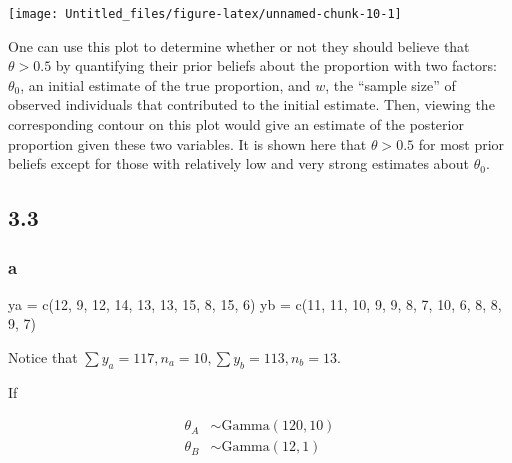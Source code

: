 \documentclass[
]{article}
\newenvironment{Shaded}{\begin{snugshade}}{\end{snugshade}}
\newcommand{\DecValTok}[1]{\textcolor[rgb]{0.00,0.00,0.81}{#1}}
\newcommand{\FunctionTok}[1]{\textcolor[rgb]{0.00,0.00,0.00}{#1}}
\newcommand{\NormalTok}[1]{#1}
\newcommand{\OtherTok}[1]{\textcolor[rgb]{0.56,0.35,0.01}{#1}}
\begin{document}
\begin{center}\texttt{[image: Untitled\_files/figure-latex/unnamed-chunk-10-1]} \end{center}

One can use this plot to determine whether or not they should believe
that \(\theta > 0.5\) by quantifying their prior beliefs about the
proportion with two factors: \(\theta_0\), an initial estimate of the
true proportion, and \(w\), the ``sample size'' of observed individuals
that contributed to the initial estimate. Then, viewing the
corresponding contour on this plot would give an estimate of the
posterior proportion given these two variables. It is shown here that
\(\theta > 0.5\) for most prior beliefs except for those with relatively
low and very strong estimates about \(\theta_0\).

\hypertarget{section-2}{%
\subsection{3.3}\label{section-2}}

\hypertarget{a-1}{%
\subsubsection{a}\label{a-1}}

\begin{Shaded}
\begin{Highlighting}[]
\NormalTok{ya }\OtherTok{=} \FunctionTok{c}\NormalTok{(}\DecValTok{12}\NormalTok{, }\DecValTok{9}\NormalTok{, }\DecValTok{12}\NormalTok{, }\DecValTok{14}\NormalTok{, }\DecValTok{13}\NormalTok{, }\DecValTok{13}\NormalTok{, }\DecValTok{15}\NormalTok{, }\DecValTok{8}\NormalTok{, }\DecValTok{15}\NormalTok{, }\DecValTok{6}\NormalTok{)}
\NormalTok{yb }\OtherTok{=} \FunctionTok{c}\NormalTok{(}\DecValTok{11}\NormalTok{, }\DecValTok{11}\NormalTok{, }\DecValTok{10}\NormalTok{, }\DecValTok{9}\NormalTok{, }\DecValTok{9}\NormalTok{, }\DecValTok{8}\NormalTok{, }\DecValTok{7}\NormalTok{, }\DecValTok{10}\NormalTok{, }\DecValTok{6}\NormalTok{, }\DecValTok{8}\NormalTok{, }\DecValTok{8}\NormalTok{, }\DecValTok{9}\NormalTok{, }\DecValTok{7}\NormalTok{)}
\end{Highlighting}
\end{Shaded}

Notice that \(\sum y_a = 117, n_a = 10, \sum y_b = 113, n_b = 13\).

If

\begin{align}
\theta_A &\sim \text{Gamma}(120, 10) \\
\theta_B &\sim \text{Gamma}(12, 1)
\end{align}
\end{document}
